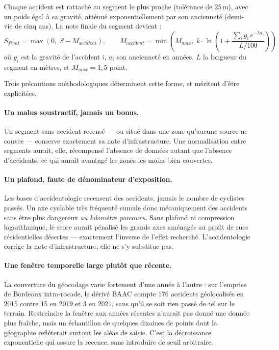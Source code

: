 Chaque accident est rattaché au segment le plus proche (tolérance de 25\,m), avec un poids égal à sa gravité, atténué exponentiellement par son ancienneté (demi-vie de cinq ans). La note finale du segment devient :
\begin{equation}
    S_{final} = \max\left(0,\; S - M_{accident}\right),
    \qquad
    M_{accident} = \min\left(M_{max},\; k \cdot \ln\left(1 + \frac{\sum_i g_i\,e^{-\lambda a_i}}{L / 100}\right)\right)
\end{equation}
où $g_i$ est la gravité de l'accident $i$, $a_i$ son ancienneté en années, $L$ la longueur du segment en mètres, et $M_{max} = 1{,}5$ point.

Trois précautions méthodologiques déterminent cette forme, et méritent d'être explicitées.

\paragraph{Un malus soustractif, jamais un bonus.} Un segment sans accident recensé --- ou situé dans une zone qu'aucune source ne couvre --- conserve exactement sa note d'infrastructure. Une normalisation entre segments aurait, elle, récompensé l'absence de données autant que l'absence d'accidents, ce qui aurait avantagé les zones les moins bien couvertes.

\paragraph{Un plafond, faute de dénominateur d'exposition.} Les bases d'accidentologie recensent des accidents, jamais le nombre de cyclistes passés. Un axe cyclable très fréquenté cumule donc mécaniquement des accidents sans être plus dangereux \emph{au kilomètre parcouru}. Sans plafond ni compression logarithmique, le score aurait pénalisé les grands axes aménagés au profit de rues résidentielles désertes --- exactement l'inverse de l'effet recherché. L'accidentologie corrige la note d'infrastructure, elle ne s'y substitue pas.

\paragraph{Une fenêtre temporelle large plutôt que récente.} La couverture du géocodage varie fortement d'une année à l'autre : sur l'emprise de Bordeaux intra-rocade, le dérivé BAAC compte 176 accidents géolocalisés en 2015 contre 15 en 2019 et 3 en 2021, sans qu'il se soit rien passé de tel sur le terrain. Restreindre la fenêtre aux années récentes n'aurait pas donné une donnée plus fraîche, mais un échantillon de quelques dizaines de points dont la géographie refléterait surtout les aléas de saisie. C'est la décroissance exponentielle qui assure la recence, sans introduire de seuil arbitraire.

